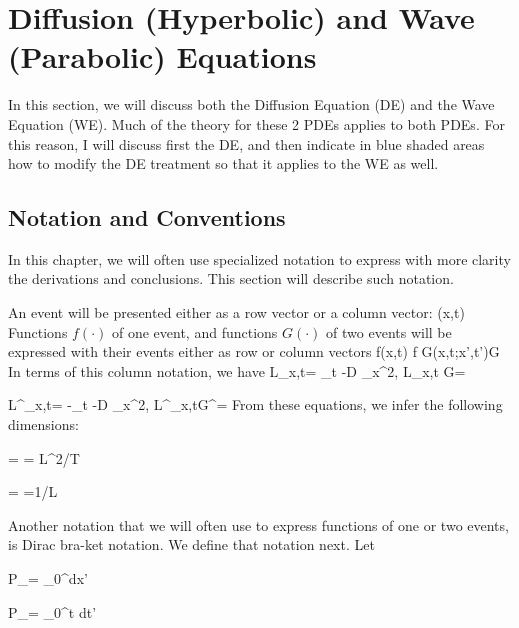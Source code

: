 \section{Diffusion (Hyperbolic) and Wave (Parabolic) Equations}

In this section,
we will
discuss both
the Diffusion Equation (DE)
and the Wave Equation (WE).
Much of the theory
for these 2 PDEs 
applies to both PDEs.
For this
reason, I will
discuss first the DE, and then indicate
in blue shaded areas 
how to modify the DE
treatment so that
it applies to the WE as well.


\subsection{Notation and Conventions}

In this chapter, we will often use specialized 
notation  to
express with more clarity 
the derivations and conclusions. This section
will describe such notation.

An event
 will be presented 
either as a row vector or a column vector:
\beq
(x,t)\leftrightarrow {}
\eeq
Functions $f(\cdot)$ of one event, and functions $G(\cdot)$
of two events
will be expressed with their events either as row or column vectors
\beq
f(x,t) \leftrightarrow f
\eeq
\beq
G({x},{t};{x'},{t'})\leftrightarrow G
\eeq
In terms of this column notation,
we have
\beq
L_{x,t}= \partial_t -D \partial_x^2,\quad
L_{x,t} G=
\eeq


\beq
L^\dagger_{x,t}= -{\partial}_t -D {\partial}_x^2,
\quad L^\dagger_{x,t}G^\dagger{}=
\eeq
From these equations,
we infer the following
dimensions:

\beq
{} = 
\implies 
{} = L^2/T
\eeq

\beq
{}=
\implies 
{}=1/L
\eeq


Another notation that we will often use to 
express functions of one or two
events, is Dirac bra-ket notation.
We define that notation next. Let



\beq
P_\rvx = \int_0^\infty dx'\; 
\eeq


\beq
P_\rvt = \int_0^t dt'\; 
\eeq

